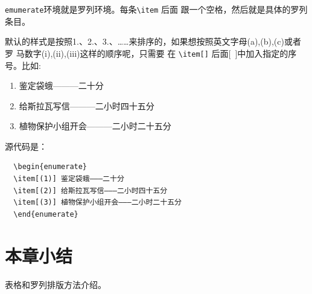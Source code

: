 \texttt{emumerate}环境就是罗列环境。每条\verb|\item| 后面
跟一个空格，然后就是具体的罗列条目。

默认的样式是按照1.、2.、3.、……来排序的，如果想按照英文字母(a),(b),(c)或者罗
马数字(i),(ii),(iii)这样的顺序呢，只需要
在 \verb|\item[]| 后面[~]中加入指定的序号。比如:
\begin{enumerate}
  \item[(1)] 鉴定袋蛾———二十分
  \item[(2)] 给斯拉瓦写信———二小时四十五分
  \item[(3)] 植物保护小组开会———二小时二十五分
\end{enumerate}
源代码是：
\begin{lstlisting}
  \begin{enumerate}
  \item[(1)] 鉴定袋蛾———二十分
  \item[(2)] 给斯拉瓦写信———二小时四十五分
  \item[(3)] 植物保护小组开会———二小时二十五分
  \end{enumerate}
\end{lstlisting}

\section{本章小结}
表格和罗列排版方法介绍。
